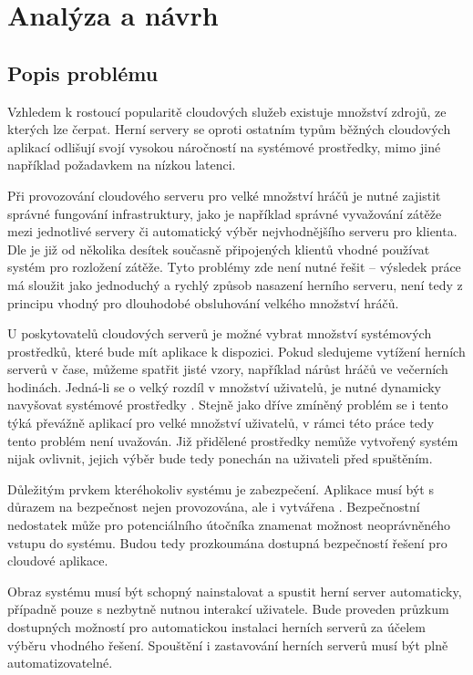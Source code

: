 \chapter[Analýza a návrh]{Analýza a návrh}

\section{Popis problému}

Vzhledem k rostoucí popularitě cloudových služeb \cite{statista_cloud_revenue} existuje množství zdrojů, ze kterých lze čerpat.
Herní servery se oproti ostatním typům běžných cloudových aplikací odlišují svojí vysokou náročností
na systémové prostředky, mimo jiné například požadavkem na nízkou latenci.

Při provozování cloudového serveru pro velké množství hráčů je nutné zajistit správné fungování infrastruktury,
jako je například správné vyvažování zátěže mezi jednotlivé servery či automatický výběr nejvhodnějšího serveru
pro klienta. Dle \cite{building_cloud_mog_server} je již od několika desítek současně připojených klientů vhodné
používat systém pro rozložení zátěže. Tyto problémy zde není nutné řešit -- výsledek práce má sloužit jako jednoduchý a rychlý
způsob nasazení herního serveru, není tedy z principu vhodný pro dlouhodobé obsluhování velkého množství hráčů.

U poskytovatelů cloudových serverů je možné vybrat množství systémových prostředků, které bude mít aplikace k dispozici.
Pokud sledujeme vytížení herních serverů v čase, můžeme spatřit jisté vzory, například nárůst hráčů ve večerních hodinách.
Jedná-li se o velký rozdíl v množství uživatelů, je nutné dynamicky navyšovat systémové prostředky \cite{efficient_resources}.
Stejně jako dříve zmíněný problém se i tento týká převážně aplikací pro velké množství uživatelů, v rámci této práce tedy tento problém není uvažován.
Již přidělené prostředky nemůže vytvořený systém nijak ovlivnit, jejich výběr bude tedy ponechán na uživateli před spuštěním.

Důležitým prvkem kteréhokoliv systému je zabezpečení. Aplikace musí být s důrazem na bezpečnost nejen provozována,
ale i vytvářena \cite{securing_cloud}. Bezpečnostní nedostatek může pro potenciálního útočníka znamenat možnost neoprávněného vstupu do systému.
Budou tedy prozkoumána dostupná bezpečností řešení pro cloudové aplikace.

Obraz systému musí být schopný nainstalovat a spustit herní server automaticky, případně pouze s nezbytně nutnou interakcí uživatele.
Bude proveden průzkum dostupných možností pro automatickou instalaci herních serverů za účelem výběru vhodného řešení.
Spouštění i zastavování herních serverů musí být plně automatizovatelné.

